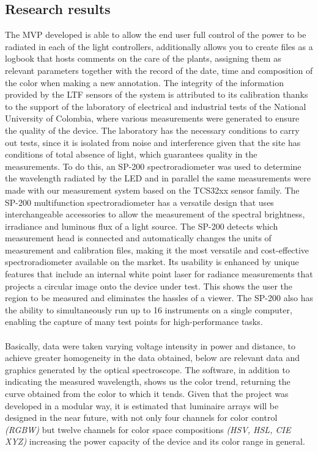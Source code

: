 \documentclass[letterpaper,12pt,twoside]{articleingud}
\begin{document}
\subsection{Research results}
The MVP developed is able to allow the end user full control of the power to be radiated in each of the light controllers, additionally allows you to create files as a logbook that hosts comments on the care of the plants, assigning them as relevant parameters together with the record of the date, time and composition of the color when making a new annotation. The integrity of the information provided by the LTF sensors of the system is attributed to its calibration thanks to the support of the laboratory of electrical and industrial tests of the National University of Colombia, where various measurements were generated to ensure the quality of the device. The laboratory has the necessary conditions to carry out tests, since it is isolated from noise and interference given that the site has conditions of total absence of light, which guarantees quality in the measurements. To do this, an SP-200 spectroradiometer was used to determine the wavelength radiated by the LED and in parallel the same measurements were made with our measurement system based on the TCS32xx sensor family. The SP-200 multifunction spectroradiometer has a versatile design that uses interchangeable accessories to allow the measurement of the spectral brightness, irradiance and luminous flux of a light source. The SP-200 detects which measurement head is connected and automatically changes the units of measurement and calibration files, making it the most versatile and cost-effective spectroradiometer available on the market. Its usability is enhanced by unique features that include an internal white point laser for radiance measurements that projects a circular image onto the device under test. This shows the user the region to be measured and eliminates the hassles of a viewer. The SP-200 also has the ability to simultaneously run up to 16 instruments on a single computer, enabling the capture of many test points for high-performance tasks.\cite{LABE}
\\\\
Basically, data were taken varying voltage intensity in power and distance, to achieve greater homogeneity in the data obtained, below are relevant data and graphics generated by the optical spectroscope. The software, in addition to indicating the measured wavelength, shows us the color trend, returning the curve obtained from the color to which it tends.
Given that the project was developed in a modular way, it is estimated that luminaire arrays will be designed in the near future, with not only four channels for color control \textit{(RGBW)} but twelve channels for color space compositions \textit{(HSV, HSL, CIE XYZ)} increasing the power capacity of the device and its color range in general.
\end{document}
